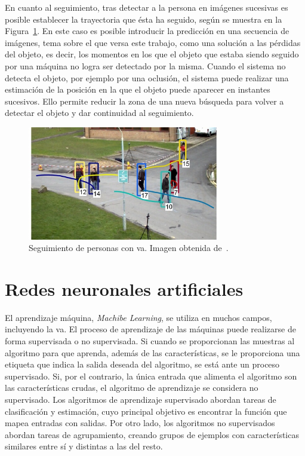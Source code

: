 En cuanto al seguimiento, tras detectar a la persona en imágenes sucesivas es posible establecer la trayectoria que ésta ha seguido, según se muestra en la Figura~\ref{fig.track}. En este caso es posible introducir la predicción en una secuencia de imágenes, tema sobre el que versa este trabajo, como una solución a las pérdidas del objeto, es decir, los momentos en los que el objeto que estaba siendo seguido por una máquina no logra ser detectado por la misma. Cuando el sistema no detecta el objeto, por ejemplo por una oclusión, el sistema puede realizar una estimación de la posición en la que el objeto puede aparecer en instantes sucesivos. Ello permite reducir la zona de una nueva búsqueda para volver a detectar el objeto y dar continuidad al seguimiento.
\vspace{10pt}
\begin{figure}[H]
		\begin{center}
			\includegraphics[width=0.75\textwidth]{ figures/intro/tracking.jpg}
			\caption{Seguimiento de personas con \acrshort{va}. Imagen obtenida de~\cite{tracking}.}
			\label{fig.track}
		\end{center}
\end{figure}

\section{Redes neuronales artificiales}
El aprendizaje máquina, \textit{Machibe Learning}, se utiliza en muchos campos, incluyendo la \acrshort{va}. El proceso de aprendizaje de las máquinas puede realizarse de forma supervisada o no supervisada. Si cuando se proporcionan las muestras al algoritmo para que aprenda, además de las características, se le proporciona una etiqueta que indica la salida deseada del algoritmo, se está ante un proceso supervisado. Si, por el contrario, la única entrada que alimenta el algoritmo son las características crudas, el algoritmo de aprendizaje se considera no supervisado. Los algoritmos de aprendizaje supervisado abordan tareas de clasificación y estimación, cuyo principal objetivo es encontrar la función que mapea entradas con salidas. Por otro lado, los algoritmos no supervisados abordan tareas de agrupamiento, creando grupos de ejemplos con características similares entre sí y distintas a las del resto.\\

